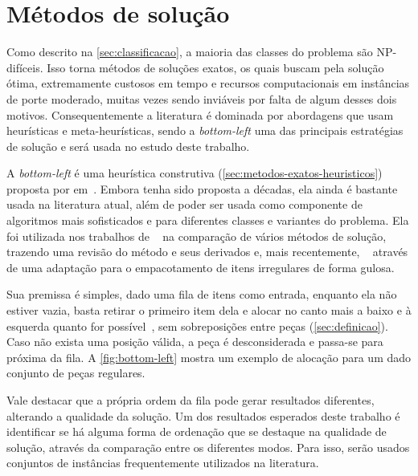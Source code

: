 \chapter{Métodos de solução}\label{ch:bottom-left}

Como descrito na \autoref{sec:classificacao}, a maioria das classes do problema são NP-difíceis.
Isso torna métodos de soluções exatos, os quais buscam pela solução ótima, extremamente custosos
em tempo e recursos computacionais em instâncias de porte moderado, muitas vezes sendo inviáveis
por falta de algum desses dois motivos.
Consequentemente a literatura é dominada por abordagens que usam heurísticas e meta-heurísticas,
sendo a \textit{bottom-left} uma das principais estratégias de solução e será usada no estudo
deste trabalho.

A \textit{bottom-left} é uma heurística construtiva (\cref{sec:metodos-exatos-heuristicos}) proposta
por \citeauthor*{baker1980orthogonal} em~\citeyear*{baker1980orthogonal}.
Embora tenha sido proposta a décadas, ela ainda é bastante usada na literatura atual, além de poder
ser usada como componente de algoritmos mais sofisticados e para diferentes classes e variantes
do problema.
Ela foi utilizada nos trabalhos de \citeauthor*{hopper2001empirical}~\citeyear{hopper2001empirical}
na comparação de vários métodos de solução, \citeauthor*{wei2011skyline}~\citeyear{wei2011skyline}
trazendo uma revisão do método e seus derivados e, mais recentemente, \citeauthor*{
    chehrazad2022fast}~\citeyear{chehrazad2022fast} através de uma adaptação para o empacotamento
de itens irregulares de forma gulosa.

Sua premissa é simples, dado uma fila de itens como entrada, enquanto ela não estiver vazia,
basta retirar o primeiro item dela e alocar no canto mais a baixo e à esquerda quanto for
possível~\cite{aprendizado-reforco}, sem sobreposições entre peças (\autoref{sec:definicao}).
Caso não exista uma posição válida, a peça é desconsiderada e passa-se para próxima da fila.
A \autoref{fig:bottom-left} mostra um exemplo de alocação para um dado conjunto de peças regulares.



Vale destacar que a própria ordem da fila pode gerar resultados diferentes, alterando a qualidade
da solução.
Um dos resultados esperados deste trabalho é identificar se há alguma forma de ordenação que
se destaque na qualidade de solução, através da comparação entre os diferentes modos.
Para isso, serão usados conjuntos de instâncias frequentemente utilizados na literatura.




